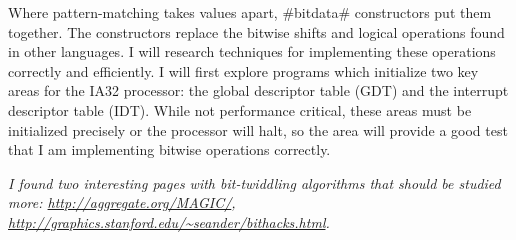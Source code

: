 \documentclass[11pt]{article}
\begin{document}
Where pattern-matching takes values apart, #bitdata# constructors put
them together. The constructors replace the bitwise shifts and logical
operations found in other languages. I will research techniques for
implementing these operations correctly and efficiently. I will first
explore programs which initialize two key areas for the IA32 processor:
the global descriptor table (GDT) and the interrupt descriptor table
(IDT). While not performance critical, these areas must be initialized
precisely or the processor will halt, so the area will provide a good
test that I am implementing bitwise operations correctly.

\emph{I found two interesting pages with bit-twiddling algorithms that should be studied more: \url{http://aggregate.org/MAGIC/}, \url{http://graphics.stanford.edu/~seander/bithacks.html}.}
\end{document}
